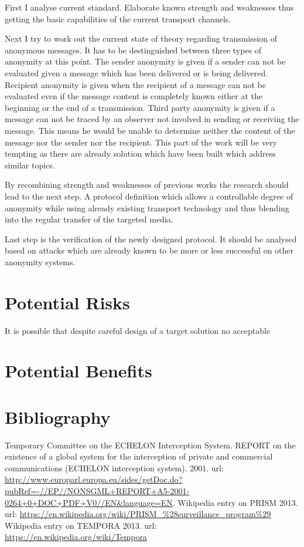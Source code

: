 \documentclass[twocolumn,a4paper]{article}
\begin{document}
First I analyse current standard. Elaborate known strength and weaknesses thus getting the basic capabilities of the current transport channels. \par

Next I try to work out the current state of theory regarding transmission of anonymous messages. It has to be destinguished between three types of anonymity at this point. The sender anonymity is given if a sender can not be evaluated given a message which has been delivered or is being delivered. Recipient anonymity is given when the recipient of a message can not be evaluated even if the message content is completely known either at the beginning or the end of a transmission. Third party anonymity is given if a message can not be traced by an observer not involved in sending or receiving the message. This means he would be unable to determine neither the content of the message nor the sender nor the recipient. This part of the work will be very tempting as there are already solution which have been built which address similar topics.\par

By recombining strength and weaknesses of previous works the research should lead to the next step. A protocol definition which allows a controllable degree of anonymity while using already existing transport technology and thus blending into the regular transfer of the targeted media. \par

Last step is the verification of the newly designed protocol. It should be analysed based on attacks which are already known to be more or less successful on other anonymity systems.\par

\section{Potential Risks}
It is possible that despite careful design of a target solution no acceptable
\section{Potential Benefits}

\section {Bibliography}
\begin{thebibliography}{99}
Temporary Committee on the ECHELON Interception System. REPORT on the existence of a global system for the interception of private and commercial communications (ECHELON interception system). 2001. url: \url{http://www.europarl.europa.eu/sides/getDoc.do?pubRef=-//EP//NONSGML+REPORT+A5-2001-0264+0+DOC+PDF+V0//EN&language=EN}.
Wikipedia entry on PRISM 2013. url: \url{https://en.wikipedia.org/wiki/PRISM_%28surveillance_program%29}
Wikipedia entry on TEMPORA 2013. url: \url{https://en.wikipedia.org/wiki/Tempora}
\end{thebibliography}
\end{document}
